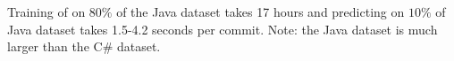 
Training of \tool on $80\%$ of the Java dataset takes 17 hours and
predicting on $10\%$ of Java dataset takes 1.5-4.2 seconds per commit.
Note: the Java dataset is much larger than the C\# dataset.
